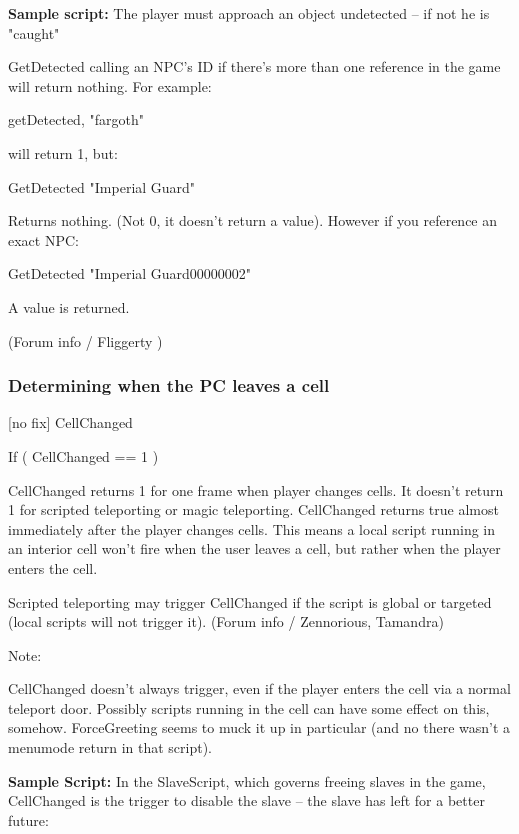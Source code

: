 \documentclass[
]{article}
\begin{document}
\textbf{Sample script:} The player must approach an object undetected --
if not he is "caught"



GetDetected calling an NPC's ID if there's more than one reference in
the game will return nothing. For example:

getDetected, "fargoth"

will return 1, but:

GetDetected "Imperial Guard"

Returns nothing. (Not 0, it doesn't return a value). However if you
reference an exact NPC:

GetDetected "Imperial Guard00000002"

A value is returned.

(Forum info / Fliggerty )

\hypertarget{determining-when-the-pc-leaves-a-cell}{%
\subsubsection{Determining when the PC leaves a
cell}\label{determining-when-the-pc-leaves-a-cell}}

{[}no fix{]} CellChanged

If ( CellChanged == 1 )

CellChanged returns 1 for one frame when player changes cells. It
doesn't return 1 for scripted teleporting or magic teleporting.
CellChanged returns true almost immediately after the player changes
cells. This means a local script running in an interior cell won't fire
when the user leaves a cell, but rather when the player enters the cell.

Scripted teleporting may trigger CellChanged if the script is global or
targeted (local scripts will not trigger it). (Forum info / Zennorious,
Tamandra)

Note:

CellChanged doesn't always trigger, even if the player enters the cell
via a normal teleport door. Possibly scripts running in the cell can
have some effect on this, somehow. ForceGreeting seems to muck it up in
particular (and no there wasn't a menumode return in that script).

\textbf{Sample Script:} In the SlaveScript, which governs freeing slaves
in the game, CellChanged is the trigger to disable the slave -- the
slave has left for a better future:


\end{document}
